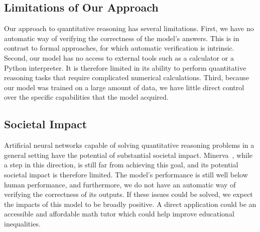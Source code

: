 \subsection{Limitations of Our Approach} Our approach to quantitative reasoning has several limitations. First, we have no automatic way of verifying the correctness of the model's answers. This is in contrast to formal approaches, for which automatic verification is intrinsic. Second, our model has no access to external tools such as a calculator or a Python interpreter. It is therefore limited in its ability to perform quantitative reasoning tasks that require complicated numerical calculations. Third, because our model was trained on a large amount of data, we have little direct control over the specific capabilities that the model acquired.

\subsection{Societal Impact} Artificial neural networks capable of solving quantitative reasoning problems in a general setting have the potential of substantial societal impact. {Minerva~}\!, while a step in this direction, is still far from achieving this goal, and its potential societal impact is therefore limited. The model's performance is still well below human performance, and furthermore, we do not have an automatic way of verifying the correctness of its outputs. If these issues could be solved, we expect the impacts of this model to be broadly positive. A direct application could be an accessible and affordable math tutor which could help improve educational inequalities.


